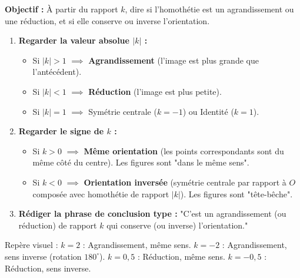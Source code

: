 \documentclass[11pt]{article}
\newcommand{\cle}[1]{{\popxbold\color{popdark}#1}}
\begin{document}
\begin{methode}
\textbf{Objectif :} À partir du rapport $k$, dire si l'homothétie est un agrandissement ou une réduction, et si elle conserve ou inverse l'orientation.
\begin{enumerate}
    \item \textbf{Regarder la valeur absolue $|k|$ :}
    \begin{itemize}
        \item Si $|k| > 1$ $\implies$ \textbf{Agrandissement} (l'image est plus grande que l'antécédent).
        \item Si $|k| < 1$ $\implies$ \textbf{Réduction} (l'image est plus petite).
        \item Si $|k| = 1$ $\implies$ Symétrie centrale ($k=-1$) ou Identité ($k=1$).
    \end{itemize}
    \item \textbf{Regarder le signe de $k$ :}
    \begin{itemize}
        \item Si $k > 0$ $\implies$ \textbf{Même orientation} (les points correspondants sont du même côté du centre). Les figures sont "dans le même sens".
        \item Si $k < 0$ $\implies$ \textbf{Orientation inversée} (symétrie centrale par rapport à $O$ composée avec homothétie de rapport $|k|$). Les figures sont "tête-bêche".
    \end{itemize}
    \item \textbf{Rédiger la phrase de conclusion type :} "C'est un agrandissement (ou réduction) de rapport $k$ qui conserve (ou inverse) l'orientation."
\end{enumerate}
\cle{Repère visuel} : $k=2$ : Agrandissement, même sens. $k=-2$ : Agrandissement, sens inverse (rotation $180^\circ$). $k=0,5$ : Réduction, même sens. $k=-0,5$ : Réduction, sens inverse.
\end{methode}
\end{document}
